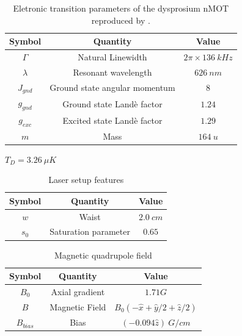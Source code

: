 \begin{table}[ht!]
    \centering
    \begin{tabular}{|c|c|c|}
        \hline
        \textbf{Symbol} & \textbf{Quantity} & \textbf{Value} \\ \hline
        $ \Gamma $ & Natural Linewidth & $ 2\pi \times 136\ kHz $ \\
        $ \lambda $ & Resonant wavelength & $ 626\ nm $ \\
        $ J_{gnd} $ & Ground state angular momentum & $ 8 $ \\
        $ g_{gnd} $ & Ground state Landè factor & $ 1.24 $ \\
        $ g_{exc} $ & Excited state Landè factor & $ 1.29 $ \\
        $ m $ & Mass & $ 164\ u $ \\
        \hline
    \end{tabular}
    \caption{Eletronic transition parameters of the dysprosium nMOT reproduced by \cite{dreon2017designing}.}
    \label{tab:electronic-transition-Dy-Dreon}
\end{table}

$ T_D = 3.26\ \mu K $

\begin{table}[ht!]
    \centering
    \begin{tabular}{|c|c|c|}
        \hline
        \textbf{Symbol} & \textbf{Quantity} & \textbf{Value} \\ \hline
        $ w $ & Waist & $ 2.0\ cm $ \\
        $ s_0 $ & Saturation parameter & $ 0.65 $ \\
        \hline
    \end{tabular}
    \caption{Laser setup features}
    \label{tab:lasers-setup}
\end{table}

\begin{table}[ht!]
    \centering
    \begin{tabular}{|c|c|c|}
        \hline
        \textbf{Symbol} & \textbf{Quantity} & \textbf{Value} \\ \hline
        $ B_0 $ & Axial gradient & $ 1.71 G $ \\
        $ B $ & Magnetic Field & $ B_0(-\hat{x} + \hat{y}/2 + \hat{z} / 2) $ \\
        $ B_{bias} $ & Bias & $ (-0.094 \hat{z})\ G / cm $ \\
        \hline
    \end{tabular}
    \caption{Magnetic quadrupole field}
    \label{tab:magnetic-field}
\end{table}


